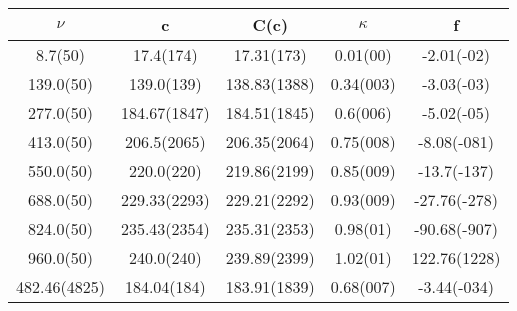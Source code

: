 \begin{table}[H]
	\centering
	\begin{tabular}{ccccc}
		$\nu$ & c & C(c) & $\kappa$ & f\\
		\hline
		8.7(50) & 17.4(174) & 17.31(173) & 0.01(00) & -2.01(-02)	\\
		139.0(50) & 139.0(139) & 138.83(1388) & 0.34(003) & -3.03(-03)	\\
		277.0(50) & 184.67(1847) & 184.51(1845) & 0.6(006) & -5.02(-05)	\\
		413.0(50) & 206.5(2065) & 206.35(2064) & 0.75(008) & -8.08(-081)	\\
		550.0(50) & 220.0(220) & 219.86(2199) & 0.85(009) & -13.7(-137)	\\
		688.0(50) & 229.33(2293) & 229.21(2292) & 0.93(009) & -27.76(-278)	\\
		824.0(50) & 235.43(2354) & 235.31(2353) & 0.98(01) & -90.68(-907)	\\
		960.0(50) & 240.0(240) & 239.89(2399) & 1.02(01) & 122.76(1228)	\\
		482.46(4825) & 184.04(184) & 183.91(1839) & 0.68(007) & -3.44(-034)	\\
	\end{tabular}
\end{table}